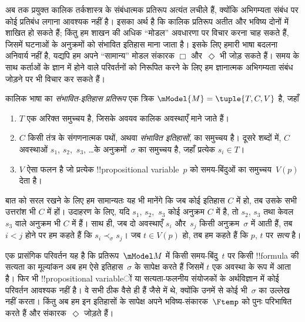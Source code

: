 \documentclass[../../../include/open-logic-section]{subfiles}
\begin{document}


अब तक प्रयुक्त कालिक तर्कशास्त्र के संबंधात्मक प्रतिरूप अत्यंत लचीले हैं,
क्योंकि अभिगम्यता संबंध पर कोई प्रतिबंध लगाना आवश्यक नहीं है। इसका अर्थ है
कि कालिक प्रतिरूप अतीत और भविष्य दोनों में शाखित हो सकते हैं; किंतु हम
शाखन की अधिक ``मोडल'' अवधारणा पर विचार करना चाह सकते हैं, जिसमें घटनाओं के
अनुक्रमों को संभावित इतिहास माना जाता है। इसके लिए हमारी भाषा बदलना अनिवार्य
नहीं है, यद्यपि हम अपने ``सामान्य'' मोडल संकारक $\Box$ और~$\Diamond$ भी
जोड़ सकते हैं। समय के साथ कर्ताओं के ज्ञान में होने वाले परिवर्तनों को
निरूपित करने के लिए हम ज्ञानात्मक अभिगम्यता संबंध जोड़ने पर भी विचार कर
सकते हैं।

\begin{defn}
  कालिक भाषा का \emph{संभावित-इतिहास प्रतिरूप} एक त्रिक
  $\mModel{M} = \tuple{T, C, V}$ है, जहाँ
  \begin{enumerate}
    \item $T$ एक अरिक्त समुच्चय है, जिसके अवयव कालिक अवस्थाएँ माने जाते हैं।
    \item $C$ किसी तंत्र के संगणनात्मक पथों, अथवा \emph{संभावित इतिहासों},
      का समुच्चय है। दूसरे शब्दों में, $C$ अवस्थाओं $s_1$, $s_2$,~$s_3$,
      \dots के अनुक्रमों~$\sigma$ का समुच्चय है, जहाँ प्रत्येक $s_i \in T$।
    \item $V$ ऐसा फलन है जो प्रत्येक !!{propositional variable}~$p$ को समय-बिंदुओं
      का समुच्चय~$V(p)$ देता है।
  \end{enumerate}
  बात को सरल रखने के लिए हम सामान्यतः यह भी मानेंगे कि जब कोई इतिहास
  $C$ में हो, तब उसके सभी उत्तरांश भी $C$ में हों। उदाहरण के लिए, यदि
  $s_1$, $s_2$,~$s_3$ कोई अनुक्रम $C$ में है, तो $s_2$, $s_3$ तथा केवल
  $s_3$ वाले अनुक्रम भी $C$ में हैं। साथ ही, जब दो अवस्थाएँ $s_i$ और~$s_j$
  किसी अनुक्रम~$\sigma$ में आती हैं, तब $i < j$ होने पर हम कहते हैं कि
  $s_i \prec_\sigma s_j$। जब $t \in V(p)$ हो, तब हम कहते हैं कि $p$,
  $t$ पर \emph{सत्य} है।
\end{defn}

एक प्रासंगिक परिवर्तन यह है कि प्रतिरूप~$\mModel M$ में किसी समय-बिंदु~$t$
पर किसी !!{formula} की सत्यता का मूल्यांकन अब हम ऐसे इतिहास~$\sigma$ के
सापेक्ष करते हैं जिसमें $t$ एक अवस्था के रूप में आता है। फिर भी
!!{propositional variable}ों या सत्यता-फलनीय संयोजकों के अर्थविज्ञान में कोई
परिवर्तन आवश्यक नहीं है। वे सभी ठीक वैसे ही हैं जैसे
 में थे, क्योंकि उनमें से कोई भी~$\sigma$ का उल्लेख
नहीं करता। किंतु अब हम इन इतिहासों के सापेक्ष अपने भविष्य-संकारक~$\Ftemp$
को पुनः परिभाषित करते हैं और संकारक~$\Diamond$ जोड़ते हैं।
\end{document}
